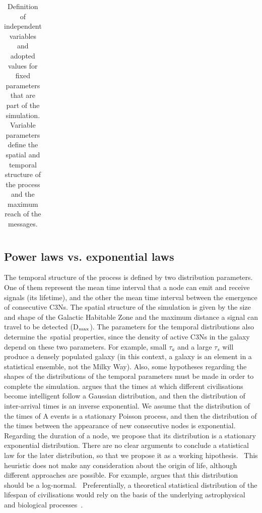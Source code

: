 \documentclass[crop]{CSLB}
\newcommand{\cetis}{C3Ns}
\begin{document}
\begin{table}
\begin{tabular}{cllll}
\hline
\end{tabular}
\caption{Definition of independent variables and adopted values for 
   fixed parameters 
   that are part of the simulation.  Variable parameters define the
   spatial and temporal structure
   of the process and the maximum reach of the messages.}
\label{T_simu_hypotheses}
\end{table}
 
    

\subsection{Power laws vs. exponential laws}\label{SS_PDF_shape}

The temporal structure of the process is defined by two distribution
parameters. One of them represent the mean time interval that a node can
emit and receive signals (its lifetime), and the other the mean time interval between the
emergence of consecutive \cetis{}.
%
The spatial structure of the simulation is
given by the size and shape of the Galactic Habitable Zone and the maximum
distance a signal can travel to be detected (D$_{\rm max}$).
%
The parameters for
the temporal distributions also determine the spatial properties, since the
density of active \cetis{} in the galaxy depend on these two parameters.
%
For
example, small $\tau_a$ and a large $\tau_s$ will produce a densely
populated galaxy (in this context, a galaxy is an element in a 
statistical ensemble, not the Milky Way).
%
Also, some hypotheses regarding the shapes of the
distributions of the temporal parameters must be made in order to complete the
simulation.
%
\citet{forgan_spatiotemporal_2011} argues that the times at which
different civilisations become intelligent follow a Gaussian distribution, and
then the distribution of inter-arrival times is an inverse exponential.
%
We
assume that the distribution of the times of A events is a stationary Poisson
process, and then the distribution of the times between the appearance of new
consecutive nodes is exponential.
%
Regarding the duration of a node, we
propose that its distribution is a stationary
exponential distribution.
%
There are no clear arguments to conclude a
statistical law for the later distribution, so that we propose it as a working
hipothesis.  
%
This heuristic does not make any consideration about the origin of life, although
different approaches are possible.
%
For example,
\citet{maccone_lognormals_2014} argues that this distribution should be a log-normal. 
%
Preferentially, a theoretical statistical distribution of the lifespan of
civilisations would rely on the basis of the underlying
astrophysical and biological processes \citep{balbi_impact_2018}. 
\end{document}
